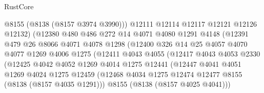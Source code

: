 \begin{lexlean}{RustCore}
\begin{coremodule}
                              @8155
                              (@8138 (@8157 @3974 @3990)))
                            @12111
                            @12114
                            @12117
                            @12121
                            @12126
                            @12132)
                          (@12380
                            @480
                            @486
                            @272
                            @14
                            @4071
                            @4080
                            @1291
                            @4148
                            (@12391
                              @479
                              @26
                              @8066
                              @4071
                              @4078
                              @1298
                              (@12400
                                @326
                                @14
                                @25
                                @4057
                                @4070
                                @4077
                                @1269
                                @4006
                                @1275
                                (@12411
                                  @4043
                                  @4055
                                  (@12417
                                    @4043
                                    @4053
                                    @2330
                                    (@12425
                                      @4042
                                      @4052
                                      @1269
                                      @4014
                                      @1275
                                      @12441
                                      (@12447
                                        @4041
                                        @4051
                                        @1269
                                        @4024
                                        @1275
                                        @12459
                                        (@12468
                                          @4034
                                          @1275
                                          @12474
                                          @12477
                                          @8155
                                          (@8138 (@8157 @4035 @1291)))
                                        @8155
                                        (@8138 (@8157 @4025 @4041)))

\end{coremodule}
\end{lexlean}
